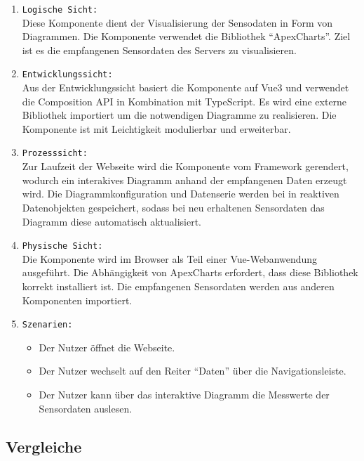 \begin{enumerate}
  \item \texttt{Logische Sicht:} \\
  Diese Komponente dient der Visualisierung der Sensodaten in Form von Diagrammen.
  Die Komponente verwendet die Bibliothek ``ApexCharts''.
  Ziel ist es die empfangenen Sensordaten des Servers zu visualisieren. 
  \item \texttt{Entwicklungssicht:} \\
  Aus der Entwicklungssicht basiert die Komponente auf Vue3 und verwendet die Composition API
  in Kombination mit TypeScript.
  Es wird eine externe Bibliothek importiert um die notwendigen Diagramme zu realisieren.
  Die Komponente ist mit Leichtigkeit modulierbar und erweiterbar. 
  \item \texttt{Prozesssicht:} \\
  Zur Laufzeit der Webseite wird die Komponente vom Framework gerendert, 
  wodurch ein interakives Diagramm anhand der empfangenen Daten erzeugt wird.
  Die Diagrammkonfiguration und Datenserie werden bei in reaktiven Datenobjekten gespeichert,
  sodass bei neu erhaltenen Sensordaten das Diagramm diese automatisch aktualisiert. 
  \item \texttt{Physische Sicht:} \\
  Die Komponente wird im Browser als Teil einer Vue-Webanwendung ausgeführt.
  Die Abhängigkeit von ApexCharts erfordert, dass diese Bibliothek korrekt installiert ist.
  Die empfangenen Sensordaten werden aus anderen Komponenten importiert.
  \item \texttt{Szenarien:} \\
    \begin{itemize}
      \renewcommand{\labelitemi}{$\Rightarrow$}
    \item Der Nutzer öffnet die Webseite.
    \item Der Nutzer wechselt auf den Reiter ``Daten'' über die Navigationsleiste.
    \item Der Nutzer kann über das interaktive Diagramm die Messwerte der Sensordaten auslesen. 
    \end{itemize}
\end{enumerate}

\subsection{Vergleiche}
\label{subsec:frontend_Vergleich}


